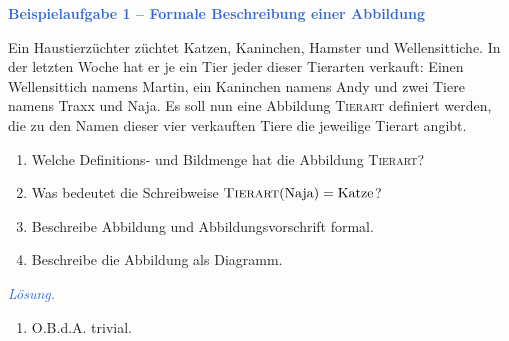 \documentclass[../abbildungen.tex]{subfiles}
\begin{document}
    \textcolor{highlight}{\textbf{Beispielaufgabe 1 -- Formale Beschreibung einer Abbildung}}
    
    Ein Haustierzüchter züchtet Katzen, Kaninchen, Hamster und Wellensittiche. In der letzten Woche hat er je ein Tier jeder dieser Tierarten verkauft: Einen Wellensittich namens Martin, ein Kaninchen namens Andy und zwei Tiere namens Traxx und Naja. Es soll nun eine Abbildung \textsc{Tierart} definiert werden, die zu den Namen dieser vier verkauften Tiere die jeweilige Tierart angibt.
    
    \begin{enumerate}[label=\textcolor{highlight}{\alph*)}]
        \item Welche Definitions- und Bildmenge hat die Abbildung \textsc{Tierart}?
        \item Was bedeutet die Schreibweise $\textsc{Tierart}(\text{Naja})=\text{Katze}$?
        \item Beschreibe Abbildung und Abbildungsvorschrift formal.
        \item Beschreibe die Abbildung als Diagramm.
    \end{enumerate}
    
    \textcolor{highlight}{\emph{Lösung.}} 
    \begin{enumerate}[label=\textcolor{highlight}{\alph*)}]
        \item O.B.d.A. trivial.
    \end{enumerate}
    
    
    
    
    
\end{document}

